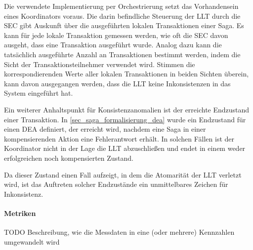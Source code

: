 Die verwendete Implementierung per Orchestrierung setzt das Vorhandensein eines Koordinators voraus. Die darin befindliche Steuerung der LLT durch die SEC gibt Auskunft über die ausgeführten lokalen Transaktionen einer Saga. Es kann für jede lokale Transaktion gemessen werden, wie oft die SEC davon ausgeht, dass eine Transaktion ausgeführt wurde. Analog dazu kann die tatsächlich ausgeführte Anzahl an Transaktionen bestimmt werden, indem die Sicht der Transaktionsteilnehmer verwendet wird. Stimmen die korrespondierenden Werte aller lokalen Transaktionen in beiden Sichten überein, kann davon ausgegangen werden, dass die LLT keine Inkonsistenzen in das System eingeführt hat.

Ein weiterer Anhaltspunkt für Konsistenzanomalien ist der erreichte Endzustand einer Transaktion. In \ref{sec_saga_formalisierung_dea} wurde ein Endzustand für einen DEA definiert, der erreicht wird, nachdem eine Saga in einer kompensierenden Aktion eine Fehlerantwort erhält. In solchen Fällen ist der Koordinator nicht in der Lage die LLT abzuschließen und endet in einem weder erfolgreichen noch kompensierten Zustand. 

Da dieser Zustand einen Fall aufzeigt, in dem die Atomarität der LLT verletzt wird, ist das Auftreten solcher Endzustände ein unmittelbares Zeichen für Inkonsistenz.

\paragraph*{Metriken}
TODO Beschreibung, wie die Messdaten in eine (oder mehrere) Kennzahlen umgewandelt wird